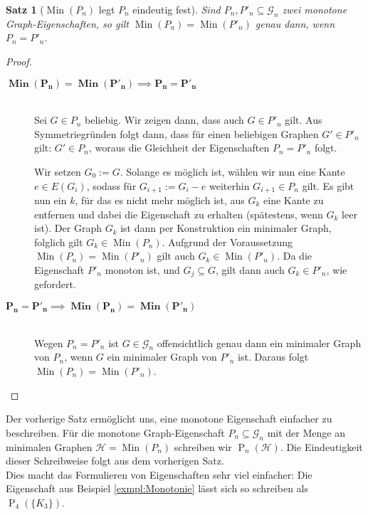 \documentclass[10pt,a4paper, footheight=1mm, bibliography=totoc]{scrreprt}
\newtheorem{Satz}[definition]{Satz}
\theoremstyle{definition}
\DeclareMathOperator\Min{Min}
\begin{document}
\begin{Satz}[$\Min(P_n)$ legt $P_n$ eindeutig fest]
Sind $P_n, P'_n \subseteq \mathcal{G}_n$ zwei monotone 
Graph-Eigenschaften, so gilt
$\Min(P_n) = \Min(P'_n)$ genau dann, wenn $P_n = P'_n$.
\end{Satz}
\begin{proof} \hfill
\vspace*{-3mm}
\begin{description}
\item[$\boldsymbol{\Min(P_n) = \Min(P'_n) \implies P_n = P'_n}$]
\hfill \\
Sei $G \in P_n$ beliebig. Wir zeigen dann, dass auch $G \in P'_n$
gilt. Aus Symmetriegründen folgt dann, dass für einen  beliebigen
Graphen $G' \in P'_n$ gilt: $G' \in P_n$, woraus die Gleichheit der
Eigenschaften $P_n = P'_n$ folgt.

Wir setzen $G_0 := G$. Solange es möglich ist, wählen wir nun
eine Kante $e \in E(G_i)$, sodass für $G_{i+1} := G_i - e$  
weiterhin $G_{i+1} \in P_n$ gilt.
Es gibt nun ein $k$, für das es nicht mehr möglich ist,
aus $G_k$ eine Kante zu entfernen und dabei die Eigenschaft
zu erhalten (spätestens, wenn $G_k$ leer ist).
Der Graph $G_k$ ist dann per Konstruktion ein minimaler
Graph, folglich gilt $G_k \in \Min(P_n)$. Aufgrund der
Voraussetzung $\Min(P_n) = \Min(P'_n)$ gilt auch 
$G_k \in \Min(P'_n)$. Da die Eigenschaft $P'_n$ monoton ist,
und $G_j \subseteq G$, gilt dann auch $G_k \in P'_n$,
wie gefordert.
\vspace*{-2mm}
\item[$\boldsymbol{P_n = P'_n \implies \Min(P_n) = \Min(P'_n)}$]
\hfill \\
Wegen $P_n = P'_n$ ist $G \in \mathcal{G}_n$ offensichtlich
genau dann ein minimaler Graph von $P_n$, wenn $G$ ein 
minimaler Graph von $P'_n$ ist. Daraus folgt 
$\Min(P_n) = \Min(P'_n)$. \qedhere
\end{description}
\end{proof}
Der vorherige Satz ermöglicht uns, eine
monotone Eigenschaft einfacher zu beschreiben. 
Für die monotone Graph-Eigenschaft $P_n\subseteq \mathcal{G}_n$
mit der Menge an minimalen Graphen $\mathcal{H} = \Min(P_n)$
schreiben wir $\operatorname{P}_n(\mathcal{H})$. Die Eindeutigkeit dieser
Schreibweise folgt aus dem vorherigen Satz. \\
Dies macht das Formulieren von Eigenschaften sehr viel einfacher:
Die Eigenschaft aus Beispiel \ref{exmpl:Monotonie} lässt sich
so schreiben als $\operatorname{P}_4(\{K_3\})$.
\end{document}
